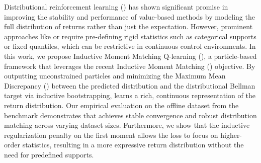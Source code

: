 Distributional reinforcement learning (\distrl) has shown significant promise in improving the stability and performance of value-based methods by modeling the full distribution of returns rather than just the expectation. However, prominent approaches like \cfiftyone or \qrdqn require pre-defining rigid statistics such as categorical supports or fixed quantiles, which can be restrictive in continuous control environments. In this work, we propose Inductive Moment Matching Q-learning (\immq), a particle-based \distrl framework that leverages the recent Inductive Moment Matching (\imm) objective. By outputting unconstrained particles and minimizing the Maximum Mean Discrepancy (\mmd) between the predicted distribution and the distributional Bellman target via inductive bootstrapping, \immq learns a rich, continuous representation of the return distribution. Our empirical evaluation on the \halfcheetah offline dataset from the \dfourrl benchmark demonstrates that \immq achieves stable convergence and robust distribution matching across varying dataset sizes. Furthermore, we show that the inductive regularization penalty on the first moment allows the \mmd loss to focus on higher-order statistics, resulting in a more expressive return distribution without the need for predefined supports.
